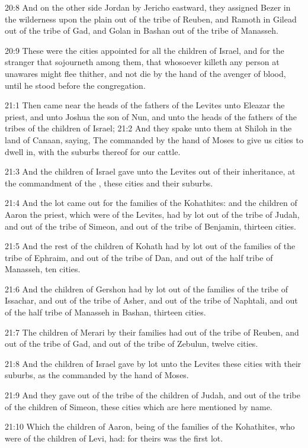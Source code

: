 20:8 And on the other side Jordan by Jericho eastward, they assigned Bezer in the wilderness upon the plain out of the tribe of Reuben, and Ramoth in Gilead out of the tribe of Gad, and Golan in Bashan out of the tribe of Manasseh.

20:9 These were the cities appointed for all the children of Israel, and for the stranger that sojourneth among them, that whosoever killeth any person at unawares might flee thither, and not die by the hand of the avenger of blood, until he stood before the congregation.

21:1 Then came near the heads of the fathers of the Levites unto Eleazar the priest, and unto Joshua the son of Nun, and unto the heads of the fathers of the tribes of the children of Israel; 21:2 And they spake unto them at Shiloh in the land of Canaan, saying, The \LORD commanded by the hand of Moses to give us cities to dwell in, with the suburbs thereof for our cattle.

21:3 And the children of Israel gave unto the Levites out of their inheritance, at the commandment of the \LORD, these cities and their suburbs.

21:4 And the lot came out for the families of the Kohathites: and the children of Aaron the priest, which were of the Levites, had by lot out of the tribe of Judah, and out of the tribe of Simeon, and out of the tribe of Benjamin, thirteen cities.

21:5 And the rest of the children of Kohath had by lot out of the families of the tribe of Ephraim, and out of the tribe of Dan, and out of the half tribe of Manasseh, ten cities.

21:6 And the children of Gershon had by lot out of the families of the tribe of Issachar, and out of the tribe of Asher, and out of the tribe of Naphtali, and out of the half tribe of Manasseh in Bashan, thirteen cities.

21:7 The children of Merari by their families had out of the tribe of Reuben, and out of the tribe of Gad, and out of the tribe of Zebulun, twelve cities.

21:8 And the children of Israel gave by lot unto the Levites these cities with their suburbs, as the \LORD commanded by the hand of Moses.

21:9 And they gave out of the tribe of the children of Judah, and out of the tribe of the children of Simeon, these cities which are here mentioned by name.

21:10 Which the children of Aaron, being of the families of the Kohathites, who were of the children of Levi, had: for theirs was the first lot.

